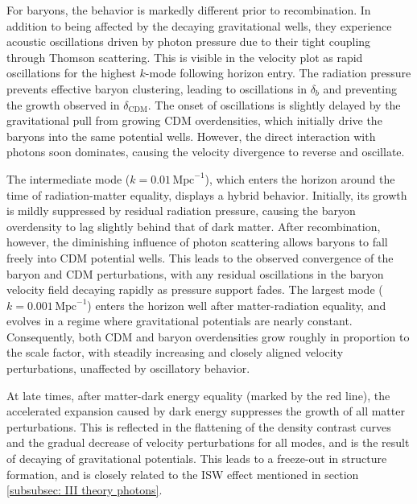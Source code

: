 \documentclass{aa}
\numberwithin{equation}{section}
\numberwithin{table}{section}
\numberwithin{figure}{section}
\begin{document}
For baryons, the behavior is markedly different prior to recombination. In addition to being affected by the decaying gravitational wells, they experience acoustic oscillations driven by photon pressure due to their tight coupling through Thomson scattering. This is visible in the velocity plot as rapid oscillations for the highest $k$-mode following horizon entry. The radiation pressure prevents effective baryon clustering, leading to oscillations in $\delta_b$ and preventing the growth observed in $\delta_\text{CDM}$. The onset of oscillations is slightly delayed by the gravitational pull from growing CDM overdensities, which initially drive the baryons into the same potential wells. However, the direct interaction with photons soon dominates, causing the velocity divergence to reverse and oscillate.

The intermediate mode ($k = 0.01\,\text{Mpc}^{-1}$), which enters the horizon around the time of radiation-matter equality, displays a hybrid behavior. Initially, its growth is mildly suppressed by residual radiation pressure, causing the baryon overdensity to lag slightly behind that of dark matter. After recombination, however, the diminishing influence of photon scattering allows baryons to fall freely into CDM potential wells. This leads to the observed  convergence of the baryon and CDM perturbations, with any residual oscillations in the baryon velocity field decaying rapidly as pressure support fades. The largest mode ($k = 0.001\,\text{Mpc}^{-1}$) enters the horizon well after matter-radiation equality, and evolves in a regime where gravitational potentials are nearly constant. Consequently, both CDM and baryon overdensities grow roughly in proportion to the scale factor, with steadily increasing and closely aligned velocity perturbations, unaffected by oscillatory behavior.

At late times, after matter-dark energy equality (marked by the red line), the accelerated expansion caused by dark energy suppresses the growth of all matter perturbations. This is reflected in the flattening of the density contrast curves and the gradual decrease of velocity perturbations for all modes, and is the result of decaying of gravitational potentials. This leads to a freeze-out in structure formation, and is closely related to the ISW effect mentioned in section \ref{subsubsec: III theory photons}. 
\end{document}
